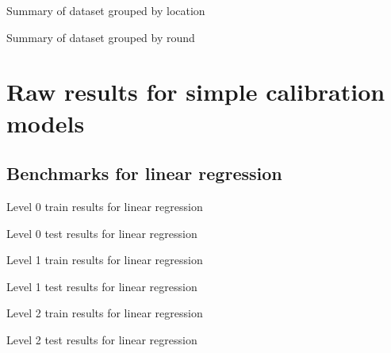 \documentclass[journal abbreviation, manuscript]{copernicus}
\begin{document}
\begin{table}[H]
\scriptsize

\caption{Summary of dataset grouped by location}
\label{tab:locationsummary}
\end{table}

\begin{table}[H]
\scriptsize

\caption{Summary of dataset grouped by round}
\label{tab:roundsummary}
\end{table}

\section{Raw results for simple calibration models}
\label{sec:simpleresults}

\subsection{Benchmarks for linear regression}
\label{sec:results-lr}

\begin{table}[H]
\centering
\scriptsize

\caption{Level 0 train results for linear regression}
\end{table}
\begin{table}[H]
\centering
\scriptsize

\caption{Level 0 test results for linear regression}
\end{table}

\begin{table}[H]
\centering
\scriptsize

\caption{Level 1 train results for linear regression}
\end{table}
\begin{table}[H]
\centering
\scriptsize

\caption{Level 1 test results for linear regression}
\end{table}

\begin{table}[H]
\centering
\scriptsize

\caption{Level 2 train results for linear regression}
\end{table}
\begin{table}[H]
\centering
\scriptsize

\caption{Level 2 test results for linear regression}
\end{table}
\end{document}
